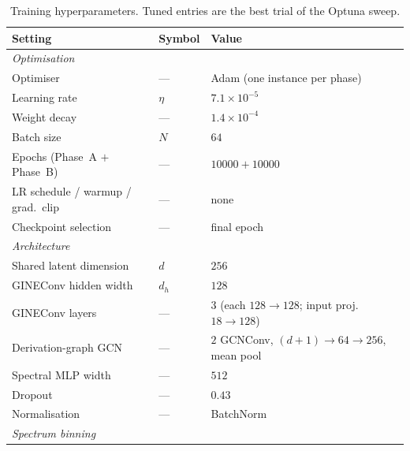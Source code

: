 \begin{table}[H]
    \centering
    \small
    \caption{Training hyperparameters. Tuned entries are the best trial of the Optuna sweep.}
    \label{tab:training-hyperparams}
    \begin{tabular}{lll}
        \hline
        Setting & Symbol & Value \\
        \hline
        \multicolumn{3}{l}{\emph{Optimisation}} \\
        Optimiser                         & ---                              & Adam (one instance per phase) \\
        Learning rate                     & $\eta$                           & $7.1\times10^{-5}$ \\
        Weight decay                      & ---                              & $1.4\times10^{-4}$ \\
        Batch size                        & $N$                              & $64$ \\
        Epochs (Phase~A $+$ Phase~B)      & ---                              & $10000 + 10000$ \\
        LR schedule / warmup / grad.\ clip & ---                             & none \\
        Checkpoint selection              & ---                              & final epoch \\
        \hline
        \multicolumn{3}{l}{\emph{Architecture}} \\
        Shared latent dimension           & $d$                              & $256$ \\
        GINEConv hidden width             & $d_h$                            & $128$ \\
        GINEConv layers                   & ---                              & $3$ (each $128\!\to\!128$; input proj.\ $18\!\to\!128$) \\
        Derivation-graph GCN              & ---                              & $2$ GCNConv, $(d{+}1)\!\to\!64\!\to\!256$, mean pool \\
        Spectral MLP width                & ---                              & $512$ \\
        Dropout                           & ---                              & $0.43$ \\
        Normalisation                     & ---                              & BatchNorm \\
        \hline
        \multicolumn{3}{l}{\emph{Spectrum binning}} \\

\end{tabular}
\end{table}
